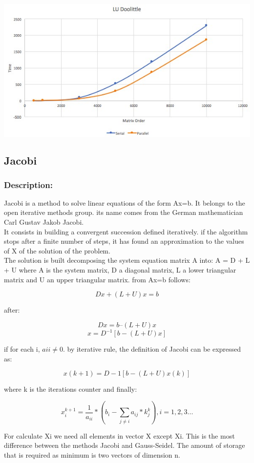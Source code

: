 \documentclass{article}
\begin{document}
\includegraphics[width=\linewidth]{./images/glud.jpeg}\\


\subsection{Jacobi}

\subsubsection{Description:}
Jacobi is a method to solve linear equations of the form Ax=b. It belongs to the open iterative methods group. its name comes from the German mathematician Carl Gustav Jakob Jacobi.\\

It consists in building a convergent succession defined iteratively. if the algorithm stops after a finite number of steps, it has found an approximation to the values of X of the solution of the problem.\\

The solution is built decomposing the system equation matrix A into:
A = D + L + U where A is the system matrix, D a diagonal matrix, L a lower
triangular matrix and U an upper triangular matrix.
from Ax=b follows:
\begin{center}
  \[Dx + (L + U)x = b\]
\end{center}
after:
\begin{center}
  \[Dx = b – (L + U)x\]
  \[x = D^{-1}[b-(L+U)x]\]
\end{center}
if for each i, $aii \neq  0.$ by iterative rule, the definition of Jacobi can be
expressed as:
\begin{center}
  \[x(k+1) = D-1 [b-(L + U)x(k)]\]
\end{center}
where k is the iterations counter and finally:
\begin{center}
  \[x_{i}^{k+1} = \frac{1}{a_{ii}}*(b_{i}-\sum_{j\neq i}a_{ij}*k_{j}^{k}) , i=1,2,3...\]
\end{center}
For calculate Xi we need all elements in vector X except Xi. This is the most
difference between the methods Jacobi and Gauss-Seidel. The amount of storage
that is required as minimum is two vectors of dimension n.\\
\end{document}
